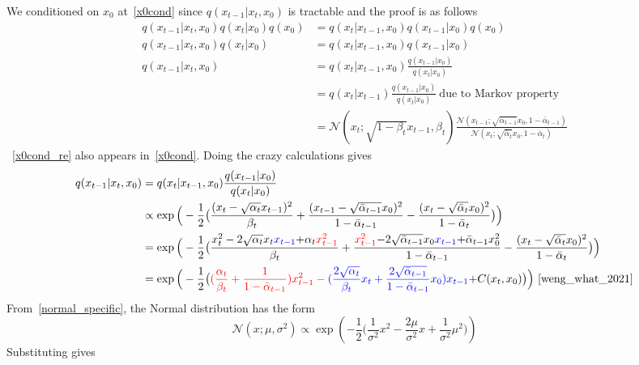 \documentclass{article}
\numberwithin{equation}{subsection}
\begin{document}
We conditioned on $x_0$ at~\ref{x0cond} since $q(x_{t-1}|x_t, x_0)$ is tractable and the proof is as follows
\begin{align}
    q(x_{t-1}|x_t, x_0)q(x_t|x_0)q(x_0) &= q(x_t|x_{t-1}, x_0)q(x_{t-1}|x_0)q(x_0)\\
    q(x_{t-1}|x_t, x_0)q(x_t|x_0) &= q(x_t|x_{t-1}, x_0)q(x_{t-1}|x_0)\\
    q(x_{t-1}|x_t, x_0) &= q(x_t|x_{t-1}, x_0)\frac{q(x_{t-1}|x_0)}{q(x_t|x_0)}\\
    &= q(x_t|x_{t-1})\frac{q(x_{t-1}|x_0)}{q(x_t|x_0)}\ \text{due to Markov property} \label{x0cond_re}\\
    &= \mathcal{N}(x_t; \sqrt{1-\beta_t}x_{t-1}, \beta_t)\frac{\mathcal{N}(x_{t-1};\sqrt{\bar{\alpha}_{t-1}}x_0,1 - \bar{\alpha}_{t-1})}{\mathcal{N}(x_t;\sqrt{\bar{\alpha}_t}x_0,1 - \bar{\alpha}_t)}
\end{align}
~\ref{x0cond_re} also appears in~\ref{x0cond}. Doing the crazy calculations gives
\begin{align}
q(x_{t-1}|x_t, x_0) 
&= q(x_t|x_{t-1}, x_0) \frac{ q(x_{t-1}|x_0) }{ q(x_t|x_0) }\\
&\propto \exp \Big(-\frac{1}{2} \big(\frac{(x_t - \sqrt{\alpha_t} x_{t-1})^2}{\beta_t} + \frac{(x_{t-1} - \sqrt{\bar{\alpha}_{t-1}} x_0)^2}{1-\bar{\alpha}_{t-1}} - \frac{(x_t - \sqrt{\bar{\alpha}_t} x_0)^2}{1-\bar{\alpha}_t} \big)\Big) \\
&= \exp \Big(-\frac{1}{2} \big(\frac{x_t^2 - 2\sqrt{\alpha_t} x_t \color{blue}{x_{t-1}} \color{black}{+ \alpha_t} \color{red}{x_{t-1}^2} }{\beta_t} + \frac{ \color{red}{x_{t-1}^2} \color{black}{- 2 \sqrt{\bar{\alpha}_{t-1}} x_0} \color{blue}{x_{t-1}} \color{black}{+ \bar{\alpha}_{t-1} x_0^2}  }{1-\bar{\alpha}_{t-1}} - \frac{(x_t - \sqrt{\bar{\alpha}_t} x_0)^2}{1-\bar{\alpha}_t} \big)\Big) \\
&= \exp\Big( -\frac{1}{2} \big( \color{red}{(\frac{\alpha_t}{\beta_t} + \frac{1}{1 - \bar{\alpha}_{t-1}})} x_{t-1}^2 - \color{blue}{(\frac{2\sqrt{\alpha_t}}{\beta_t} x_t + \frac{2\sqrt{\bar{\alpha}_{t-1}}}{1 - \bar{\alpha}_{t-1}} x_0)} x_{t-1} \color{black}{ + C(x_t, x_0) \big)\Big)}~\cite{weng_what_2021}
\end{align}
From~\ref{normal_specific}, the Normal distribution has the form 
\begin{equation}
    \mathcal{N}(x; \mu, \sigma^2)\propto  \exp\left(-\frac {1}{2}\Big(\frac {1}{\sigma^2}x^2-\frac {2\mu}{\sigma^2} x+\frac {1}{\sigma^2}\mu^2\Big)\right)
\end{equation}
Substituting gives
\end{document}
